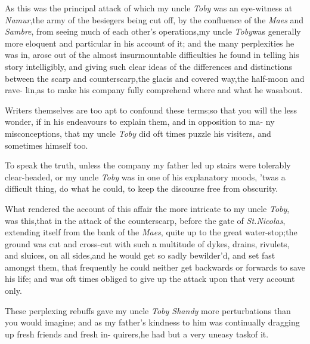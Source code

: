 \documentclass{article}
\begin{document}
As this was the principal attack of which my uncle \textit{Toby}
was an eye-witness at \textit{Namur},\tsh the army of the
besiegers being cut off, by the confluence of the \textit{Maes}
and \textit{Sambre}, from seeing much of each other’s
operations,\tsk my uncle \textit{Toby}\break was generally more
eloquent and particular in his account of it; and the many
perplexities he was in, arose out of the\break
almost insurmountable difficulties he\break
found in telling his story intelligibly,\break
and giving such clear ideas of the differences and distinctions
between the scarp and counterscarp,\tsh the glacis and
covered way,\tsh the half-moon and rave-\break
lin,\tsh as to make his company fully\break
comprehend where and what he was\break about.

Writers themselves are too apt to confound these terms;\tsh so that
you will the less wonder, if in his endeavours to explain them, and
in opposition to ma- ny misconceptions, that my uncle \textit{Toby} did
oft times puzzle his visiters, and sometimes himself too.

To speak the truth, unless the compa\-ny my father led up stairs
were tolerably clear-headed, or my uncle \textit{Toby} was in one of
his explanatory moods, ’twas a difficult thing, do what he could, to keep the
discourse free from obscurity.

What rendered the account of this\break 
affair the more intricate to my uncle\break
\textit{Toby}, was this,\tsk that in the attack of the
counterscarp, before the gate of \textit{St.\@ Nicolas}, extending
itself from the bank of the \textit{Maes}, quite up to the great
water-stop;\tsk the ground was cut and cross-cut with such a
multitude of dykes, drains, rivulets, and sluices, on all
sides,\tsk and he would get so sadly bewilder’d, and set fast
amongst them, that frequently he could neither get backwards or
forwards to save his life; and was oft times obliged to give up the
attack upon that very account only.

These perplexing rebuffs gave my\break
uncle \textit{Toby Shandy} more perturbations\break
than you would imagine; and as my\break
father’s kindness to him was continually\break
dragging up fresh friends and fresh in-\break 
quirers,\tsk he had but a very uneasy task\break of it.
\end{document}
